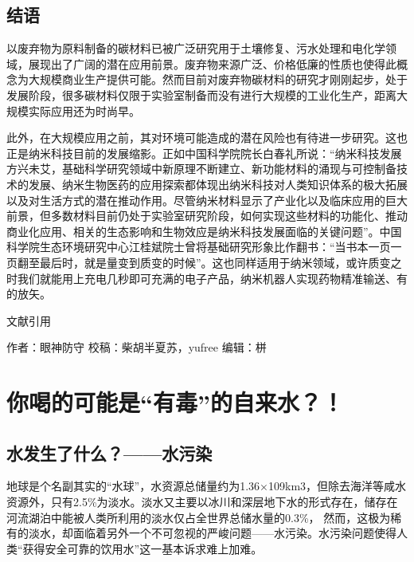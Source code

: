 \documentclass[
]{book}
\begin{document}
\hypertarget{ux7ed3ux8bed}{%
\subsection{结语}\label{ux7ed3ux8bed}}

以废弃物为原料制备的碳材料已被广泛研究用于土壤修复、污水处理和电化学领域，展现出了广阔的潜在应用前景。废弃物来源广泛、价格低廉的性质也使得此概念为大规模商业生产提供可能。然而目前对废弃物碳材料的研究才刚刚起步，处于发展阶段，很多碳材料仅限于实验室制备而没有进行大规模的工业化生产，距离大规模实际应用还为时尚早。

此外，在大规模应用之前，其对环境可能造成的潜在风险也有待进一步研究。这也正是纳米科技目前的发展缩影。正如中国科学院院长白春礼所说：``纳米科技发展方兴未艾，基础科学研究领域中新原理不断建立、新功能材料的涌现与可控制备技术的发展、纳米生物医药的应用探索都体现出纳米科技对人类知识体系的极大拓展以及对生活方式的潜在推动作用。尽管纳米材料显示了产业化以及临床应用的巨大前景，但多数材料目前仍处于实验室研究阶段，如何实现这些材料的功能化、推动商业化应用、相关的生态影响和生物效应是纳米科技发展面临的关键问题''。中国科学院生态环境研究中心江桂斌院士曾将基础研究形象比作翻书：``当书本一页一页翻至最后时，就是量变到质变的时候''。这也同样适用于纳米领域，或许质变之时我们就能用上充电几秒即可充满的电子产品，纳米机器人实现药物精准输送、有的放矢。

文献引用

作者：眼神防守
校稿：柴胡半夏苏，yufree
编辑：栟

\hypertarget{ux4f60ux559dux7684ux53efux80fdux662fux6709ux6bd2ux7684ux81eaux6765ux6c34}{%
\section{你喝的可能是``有毒''的自来水？！}\label{ux4f60ux559dux7684ux53efux80fdux662fux6709ux6bd2ux7684ux81eaux6765ux6c34}}

\hypertarget{ux6c34ux53d1ux751fux4e86ux4ec0ux4e48ux6c34ux6c61ux67d3}{%
\subsection{水发生了什么？------水污染}\label{ux6c34ux53d1ux751fux4e86ux4ec0ux4e48ux6c34ux6c61ux67d3}}

地球是个名副其实的``水球''，水资源总储量约为1.36×109km3，但除去海洋等咸水资源外，只有2.5\%为淡水。淡水又主要以冰川和深层地下水的形式存在，储存在河流湖泊中能被人类所利用的淡水仅占全世界总储水量的0.3\%， 然而，这极为稀有的淡水，却面临着另外一个不可忽视的严峻问题------水污染。水污染问题使得人类``获得安全可靠的饮用水''这一基本诉求难上加难。
\end{document}
